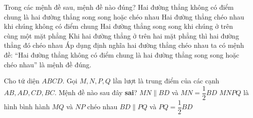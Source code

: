 \begin{ex}%
	 Trong các mệnh đề sau, mệnh đề nào đúng?
	 	\choice
	 {\True Hai đường thẳng không có điểm chung là hai đường thẳng song song hoặc chéo nhau}
	 {Hai đường thẳng chéo nhau khi chúng không có điểm chung}
	 {Hai đường thẳng song song khi chúng ở trên cùng một mặt phẳng}
	 {Khi hai đường thẳng ở trên hai mặt phẳng thì hai đường thẳng đó chéo nhau}
	 \loigiai
	 { Áp dụng định nghĩa hai đường thẳng chéo nhau ta có mệnh đề: ``Hai đường thẳng không có điểm chung là hai đường thẳng song song hoặc chéo nhau'' là mệnh đề đúng.
	 }
\end{ex}

\begin{ex}%
	 Cho tứ diện $ABCD$. Gọi $M, N, P, Q $ lần lượt là trung điểm của các cạnh $AB, AD, CD, BC$. Mệnh đề nào sau đây {\bf {sai}}?
	 	\choice
	 {$MN \parallel BD$ và $MN =\dfrac{1}{2}BD$}
	 {$MNPQ$ là hình bình hành}
	 {\True $MQ$ và $NP$ chéo nhau}
	 {$BD \parallel PQ$ và $PQ =\dfrac{1}{2}BD$}
	 \loigiai
	 {
	 	
	 }
\end{ex}

